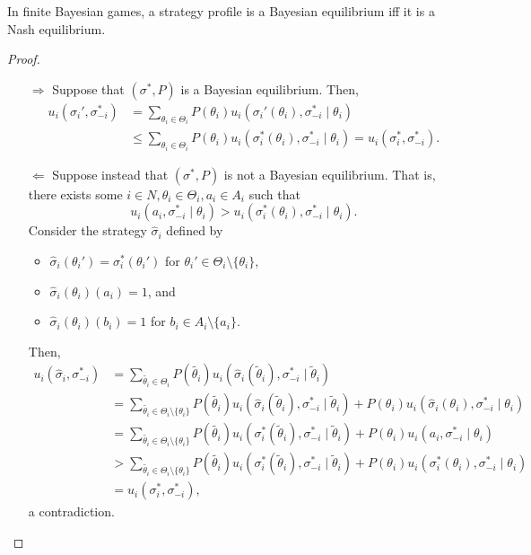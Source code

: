 	\begin{ftheo}
		In finite Bayesian games, a strategy profile is a Bayesian equilibrium iff it is a Nash equilibrium.
	\end{ftheo}
	\begin{proof}
		\phantom{pain}
		\begin{itemize}
			\item[$\Rightarrow$] Suppose that $(\sigma^*,P)$ is a Bayesian equilibrium. Then,
			\begin{align*}
				u_i(\sigma_i',\sigma_{-i}^*) &= \sum_{\theta_i \in \Theta_i} P(\theta_i) u_i(\sigma_i'(\theta_i),\sigma_{-i}^* \mid \theta_i) \\
					&\le \sum_{\theta_i \in \Theta_i} P(\theta_i) u_i(\sigma_i^*(\theta_i),\sigma_{-i}^* \mid \theta_i) = u_i(\sigma_i^*,\sigma_{-i}^*).
			\end{align*}
			\item[$\Leftarrow$] Suppose instead that $(\sigma^*,P)$ is not a Bayesian equilibrium. That is, there exists some $i\in N,\theta_i \in \Theta_i,a_i \in A_i$ such that
			\[ u_i(a_i,\sigma_{-i}^* \mid \theta_i) > u_i(\sigma_i^*(\theta_i),\sigma_{-i}^* \mid \theta_i). \]
			Consider the strategy $\widehat{\sigma}_i$ defined by
			\begin{itemize}
				\item $\widehat{\sigma}_i(\theta_i') = \sigma_i^*(\theta_i')$ for $\theta_i' \in \Theta_i \setminus \{\theta_i\}$,
				\item $\widehat{\sigma}_i(\theta_i)(a_i) = 1$, and
				\item $\widehat{\sigma}_i(\theta_i)(b_i) = 1$ for $b_i \in A_i \setminus \{a_i\}$.
			\end{itemize}
			Then,
			\begin{align*}
				u_i(\widehat{\sigma}_i,\sigma_{-i}^*) &= \sum_{\tilde{\theta_i} \in \Theta_i} P(\tilde{\theta_i}) u_i(\widehat{\sigma}_i(\tilde{\theta}_i),\sigma_{-i}^* \mid \tilde{\theta}_i) \\
					&= \sum_{\tilde{\theta_i} \in \Theta_i \setminus \{\theta_i\}} P(\tilde{\theta_i}) u_i(\widehat{\sigma}_i(\tilde{\theta}_i),\sigma_{-i}^* \mid \tilde{\theta}_i) + P(\theta_i) u_i(\widehat{\sigma}_i(\theta_i),\sigma_{-i}^* \mid \theta_i) \\
					&= \sum_{\tilde{\theta_i} \in \Theta_i \setminus \{\theta_i\}} P(\tilde{\theta_i}) u_i(\sigma^*_i(\tilde{\theta}_i),\sigma_{-i}^* \mid \tilde{\theta}_i) + P(\theta_i) u_i(a_i,\sigma_{-i}^* \mid \theta_i) \\
					&> \sum_{\tilde{\theta_i} \in \Theta_i \setminus \{\theta_i\}} P(\tilde{\theta_i}) u_i(\sigma^*_i(\tilde{\theta}_i),\sigma_{-i}^* \mid \tilde{\theta}_i) + P(\theta_i) u_i(\sigma_i^*(\theta_i),\sigma_{-i}^* \mid \theta_i) \\
					&= u_i(\sigma_i^*,\sigma_{-i}^*),
			\end{align*}
			a contradiction.
		\end{itemize}
	\end{proof}

